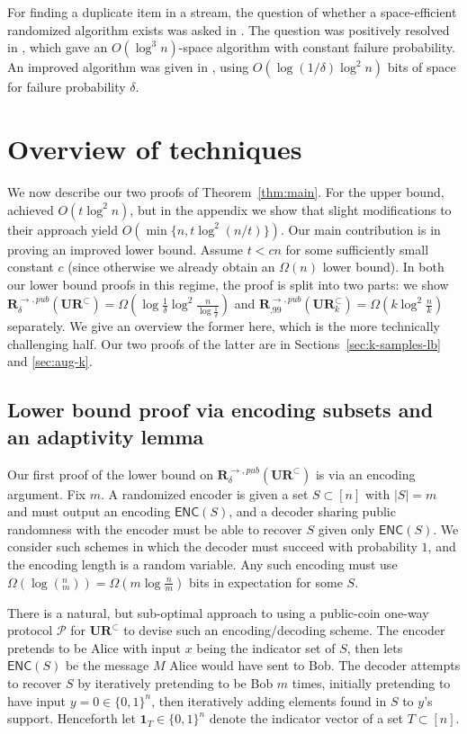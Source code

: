 \documentclass[11pt]{article}
\newcommand{\enc}{\textsf{ENC}\xspace}
\newcommand{\ur}{\mathbf{UR}\xspace}
\newcommand{\randcom}{\mathbf{R}}
\begin{document}
For finding a duplicate item in a stream, the question of whether a space-efficient randomized algorithm exists was asked in \cite{Muthukrishnan05,Tarui07}. The question was positively resolved in \cite{GopalanR09}, which gave an $O(\log^3 n)$-space algorithm with constant failure probability. An improved algorithm was given in \cite{JowhariST11}, using $O(\log(1/\delta) \log^2 n)$ bits of space for failure probability $\delta$.

\section{Overview of techniques}\label{sec:overview}
We now describe our two proofs of Theorem~\ref{thm:main}. For the upper bound, \cite{JowhariST11} achieved $O(t\log^2n)$, but in the appendix we show that slight modifications to their approach yield $O(\min\{n,t\log^2(n/t)\})$. Our main contribution is in proving an improved lower bound. Assume $t < cn$ for some sufficiently small constant $c$ (since otherwise we already obtain an $\Omega(n)$ lower bound). In both our lower bound proofs in this regime, the proof is split into two parts: we show $\randcom^{\rightarrow,pub}_\delta(\ur^\subset) = \Omega(\log \frac 1{\delta}\log^2 \frac n{\log\frac 1{\delta}})$ and $\randcom^{\rightarrow,pub}_{.99}(\ur_k^\subset)=\Omega(k\log^2\frac nk)$ separately. We give an overview the former here, which is the more technically challenging half. Our two proofs of the latter are in Sections~\ref{sec:k-samples-lb} and \ref{sec:aug-k}.

\subsection{Lower bound proof via encoding subsets and an adaptivity lemma}\label{sec:adaptivity-intro}

Our first proof of the lower bound on $\randcom^{\rightarrow,pub}_\delta(\ur^\subset)$ is via an encoding argument. Fix $m$. A randomized encoder is given a set $S\subset[n]$ with $|S| = m$ and must output an encoding $\enc(S)$, and a decoder sharing public randomness with the encoder must be able to recover $S$ given only $\enc(S)$. We consider such schemes in which the decoder must succeed with probability $1$, and the encoding length is a random variable. Any such encoding must use $\Omega(\log(^n_m)) = \Omega(m\log \frac nm)$ bits in expectation for some $S$.

There is a natural, but sub-optimal approach to using a public-coin one-way protocol $\mathcal{P}$ for $\ur^\subset$ to devise such an encoding/decoding scheme.  The encoder pretends to be Alice with input $x$ being the indicator set of $S$, then lets $\enc(S)$ be the message $M$ Alice would have sent to Bob. The decoder attempts to recover $S$ by iteratively pretending to be Bob $m$ times, initially pretending to have input $y=0\in\{0,1\}^n$, then iteratively adding elements found in $S$ to $y$'s support. Henceforth let $\mathbf{1}_T\in\{0,1\}^n$ denote the indicator vector of a set $T\subset[n]$.
\end{document}
